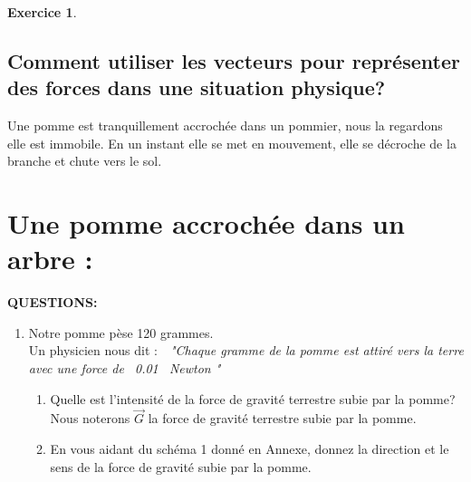 \documentclass[a4paper,10.9pt]{article}
\theoremstyle{definition}
\newtheorem{exo}{Exercice}
\newcommand{\V}{\overrightarrow}
\begin{document}
\begin{exo}
\subsection*{Comment utiliser les vecteurs pour représenter des forces dans une situation physique?}
\noindent Une pomme est tranquillement accrochée dans un pommier, nous la regardons elle est immobile. En un instant elle se met en mouvement, elle se décroche de la branche et chute vers le sol. 
\section*{Une pomme accrochée dans un arbre :}

\textbf{QUESTIONS:}\\
\begin{enumerate}
	\item Notre pomme pèse 120 grammes.\\
	 Un physicien nous dit :~~\textit{"Chaque gramme de la pomme est attiré vers la terre avec une force de ~0.01~ Newton "}\\
	 \begin{enumerate}
	 	\item Quelle est l'intensité de la force de gravité terrestre subie par la pomme? Nous noterons $\V{G}$ la force de gravité terrestre subie par la pomme.
	 	\item En vous aidant du schéma 1 donné en Annexe, donnez la direction et le sens de la force de gravité subie par la pomme.\\
	 \end{enumerate} 
	 

\end{enumerate}
\end{exo}
\end{document}
